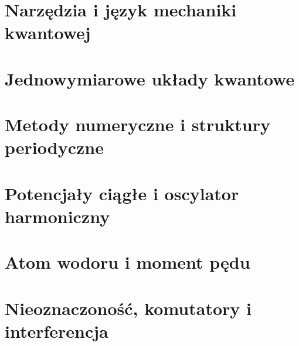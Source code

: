 \documentclass[11pt,a4paper]{report}
\begin{document}
\hypersetup{pageanchor=false}

\clearpage
\hypersetup{pageanchor=true}

\setcounter{tocdepth}{1}
\tableofcontents

\clearpage
{}



\part{Narzędzia i język mechaniki kwantowej}



\part{Jednowymiarowe układy kwantowe}





\part{Metody numeryczne i struktury periodyczne}



\part{Potencjały ciągłe i oscylator harmoniczny}




\part{Atom wodoru i moment pędu}



\part{Nieoznaczoność, komutatory i interferencja}



\end{document}

